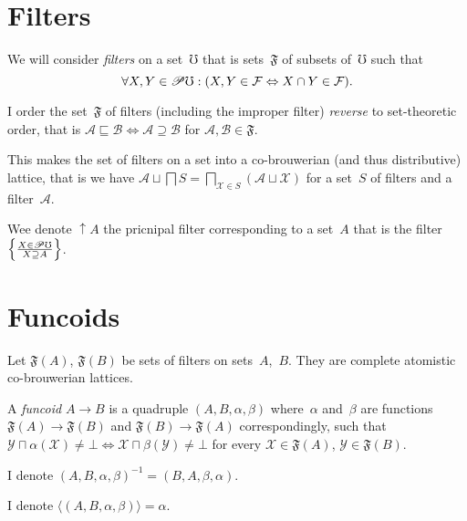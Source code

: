 \documentclass{amsart}
\begin{document}
\section{Filters}

We will consider \emph{filters} on a set~$\mho$ that is sets~$\mathfrak{F}$ of subsets of~$\mho$ such that
\[ \forall X,Y\in\mathscr{P}\mho:
(X,Y\in\mathcal{F} \Leftrightarrow X\cap Y\in\mathcal{F}). \]

\begin{defn}
I order the set~$\mathfrak{F}$ of filters (including the improper filter) \emph{reverse} to set-theoretic order, that is
$\mathcal{A} \sqsubseteq \mathcal{B} \Leftrightarrow \mathcal{A} \supseteq \mathcal{B}$
for $\mathcal{A},\mathcal{B}\in\mathfrak{F}$.
\end{defn}

\begin{prop}
This makes the set of filters on a set into a co-brouwerian (and thus distributive) lattice, that is we have
$\mathcal{A} \sqcup \bigsqcap S = \bigsqcap_{\mathcal{X}\in S} (\mathcal{A} \sqcup \mathcal{X})$
for a set~$S$ of filters and a filter~$\mathcal{A}$.
\end{prop}

Wee denote $\uparrow A$ the pricnipal filter corresponding to a set~$A$ that is the filter $\left\{ \frac{X\in\mathscr{P}\mho}{X\supseteq A}\right\}$.

\section{Funcoids}

Let $\mathfrak{F}(A)$, $\mathfrak{F}(B)$ be sets of filters on sets~$A$,~$B$.
They are complete atomistic co-brouwerian lattices.

\begin{defn}
A \emph{funcoid} $A\rightarrow B$ is a quadruple $(A,B,\alpha,\beta)$
where~$\alpha$ and~$\beta$ are functions $\mathfrak{F}(A)\rightarrow \mathfrak{F}(B)$
and $\mathfrak{F}(B)\rightarrow \mathfrak{F}(A)$ correspondingly, such that
$\mathcal{Y} \sqcap \alpha(\mathcal{X}) \ne \bot \Leftrightarrow \mathcal{X} \sqcap \beta(\mathcal{Y}) \ne \bot$
for every $\mathcal{X}\in\mathfrak{F}(A)$, $\mathcal{Y}\in\mathfrak{F}(B)$.
\end{defn}

\begin{defn}
I denote $(A,B,\alpha,\beta)^{-1} = (B,A,\beta,\alpha)$.
\end{defn}

\begin{defn}
I denote $\langle(A,B,\alpha,\beta)\rangle = \alpha$.
\end{defn}
\end{document}
